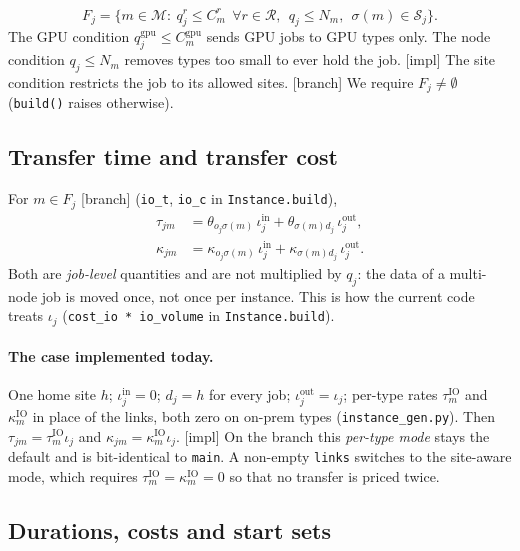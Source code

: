 \documentclass[11pt,a4paper]{article}
\newcommand{\M}{\mathcal{M}}
\newcommand{\Sites}{\mathcal{S}}
\newcommand{\Res}{\mathcal{R}}
\newcommand{\code}[1]{\texttt{#1}}
\newcommand{\pin}{\mathrm{in}}
\newcommand{\pout}{\mathrm{out}}
\newcommand{\status}[1]{\textsf{\small[#1]}}
\begin{document}
\begin{equation}\label{eq:F}
  F_j=\bigl\{m\in\M:\ q^r_j\le C^r_m\ \ \forall r\in\Res,\ \ q_j\le N_m,
  \ \ \sigma(m)\in\Sites_j\bigr\}.
\end{equation}
The GPU condition $q^{\mathrm{gpu}}_j\le C^{\mathrm{gpu}}_m$ sends GPU jobs to
GPU types only. The node condition $q_j\le N_m$ removes types too small to
ever hold the job. \status{impl} The site condition restricts the job to its
allowed sites. \status{branch} We require $F_j\neq\emptyset$
(\code{build()} raises otherwise).

\subsection{Transfer time and transfer cost}\label{sec:geo}

For $m\in F_j$ \status{branch} (\code{io\_t}, \code{io\_c} in \code{Instance.build}),
\begin{align}
  \tau_{jm} &= \theta_{o_j\sigma(m)}\,\iota^\pin_j+\theta_{\sigma(m)d_j}\,\iota^\pout_j,
  \label{eq:tau}\\
  \kappa_{jm} &= \kappa_{o_j\sigma(m)}\,\iota^\pin_j+\kappa_{\sigma(m)d_j}\,\iota^\pout_j.
  \label{eq:kappa}
\end{align}
Both are \emph{job-level} quantities and are not multiplied by $q_j$: the data
of a multi-node job is moved once, not once per instance. This is how the
current code treats $\iota_j$ (\code{cost\_io * io\_volume} in
\code{Instance.build}).

\paragraph{The case implemented today.} One home site $h$; $\iota^\pin_j=0$;
$d_j=h$ for every job; $\iota^\pout_j=\iota_j$;
per-type rates $\tau^{\mathrm{IO}}_m$ and $\kappa^{\mathrm{IO}}_m$ in place of
the links, both zero on on-prem types (\code{instance\_gen.py}). Then
$\tau_{jm}=\tau^{\mathrm{IO}}_m\iota_j$ and
$\kappa_{jm}=\kappa^{\mathrm{IO}}_m\iota_j$. \status{impl} On the branch this
\emph{per-type mode} stays the default and is bit-identical to \code{main}. A
non-empty \code{links} switches to the site-aware mode, which requires
$\tau^{\mathrm{IO}}_m=\kappa^{\mathrm{IO}}_m=0$ so that no transfer is priced twice.

\subsection{Durations, costs and start sets}
\end{document}
